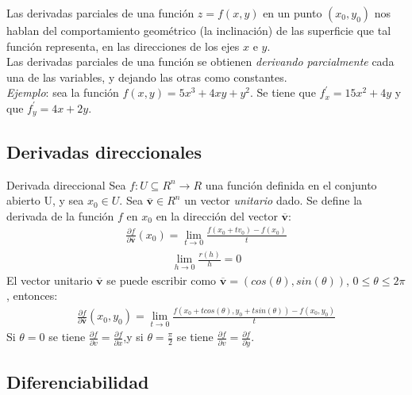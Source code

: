 \documentclass[a4paper, twoside]{article}
\numberwithin{equation}{section}
\numberwithin{figure}{section}
\numberwithin{table}{section}
\newcommand{\vect}[1]{\overline{\textbf{#1}}}
\begin{document}
Las derivadas parciales de una función $z = f(x, y)$ en un punto $(x_0, y_0)$ nos hablan del comportamiento geométrico (la inclinación) de las superficie que tal función representa, en las direcciones de los ejes $x$ e $y$.\\

Las derivadas parciales de una función se obtienen \emph{derivando parcialmente} cada una de las variables, y dejando las otras como constantes.\\

\textit{Ejemplo}: sea la función $f(x, y) = 5x^3 + 4xy + y^2$.
Se tiene que $f^\prime_x = 15x^2 + 4y$ y que $f^\prime_y = 4x + 2y$.

\subsection{Derivadas direccionales}
\begin{definicion*}{Derivada direccional}
	Sea $f: U \subseteq R^n \rightarrow R$ una función definida en el conjunto abierto U, y sea $x_0 \in U$. Sea $\vect{v} \in R^n$ un vector \emph{unitario} dado. Se define la derivada de la función $f$ en $x_0$ en la dirección del vector $\vect{v}$:
	\begin{align}
		\frac{\partial f}{\partial \vect{v}} \left( x_0 \right) = \lim_{t \to 0} \frac{f(x_0 + t v_0) - f(x_0)}{t}
	\end{align}
	\begin{align}
		\lim_{h \to 0} \frac{r(h)}{h} = 0
	\end{align}
	El vector unitario $\vect{v}$ se puede escribir como $\vect{v} = (cos(\theta), sin(\theta))$, $0 \leq \theta \leq2 \pi$, entonces:
	\begin{align}
		\frac{\partial f}{\partial \vect{v}}(x_0,y_0) = \lim_{t \to 0} \frac{f(x_0 + tcos(\theta), y_0 + tsin(\theta)) - f(x_0,y_0)}{t}
	\end{align}
	Si $\theta = 0$ se tiene $\frac{\partial f}{\partial v} = \frac{\partial f}{\partial x}$,y si $\theta = \frac{\pi}{2}$ se tiene $\frac{\partial f}{\partial v} = \frac{\partial f}{\partial y}$. 
\end{definicion*}

\subsection{Diferenciabilidad}
\end{document}
